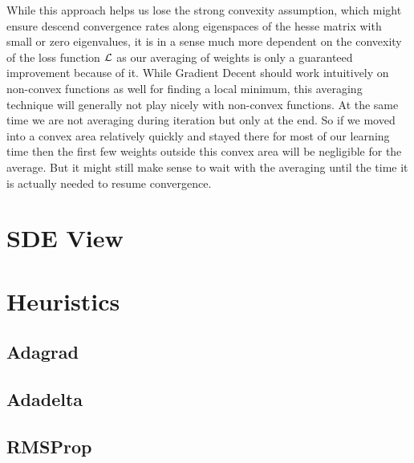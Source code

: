 While this approach helps us lose the strong convexity assumption, which might
ensure descend convergence rates along eigenspaces of the hesse matrix with
small or zero eigenvalues, it is in a sense much more dependent on the convexity
of the loss function \(\mathcal{L}\) as our averaging of weights is only a
guaranteed improvement because of it. While Gradient Decent should work
intuitively on non-convex functions as well for finding a local minimum, this
averaging technique will generally not play nicely with non-convex functions.
At the same time we are not averaging during iteration but only at the end.
So if we moved into a convex area relatively quickly and stayed there for
most of our learning time then the first few weights outside this convex
area will be negligible for the average.
But it might still make sense to wait with the averaging until the time it is
actually needed to resume convergence.


\section{SDE View}

\textcite{simsekliTailIndexAnalysisStochastic2019}


\section{Heuristics}

\subsection{Adagrad}

\subsection{Adadelta}

\subsection{RMSProp}


\endinput
